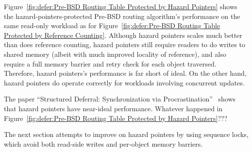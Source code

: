 Figure~\ref{fig:defer:Pre-BSD Routing Table Protected by Hazard Pointers}
shows the hazard-pointers-protected Pre-BSD routing algorithm's
performance on the same read-only workload as for
Figure~\ref{fig:defer:Pre-BSD Routing Table Protected by Reference Counting}.
Although hazard pointers scales much better than does reference counting,
hazard pointers still require readers to do writes to shared
memory (albeit with much improved locality of reference),
and also require a full memory barrier and retry check for each
object traversed.
Therefore, hazard pointers's performance is far short of ideal.
On the other hand, hazard pointers do operate correctly for workloads
involving concurrent updates.

\QuickQuiz{}
	The paper ``Structured Deferral: Synchronization via
	Procrastination''~\cite{McKenney:2013:SDS:2483852.2483867}
	shows that hazard pointers have near-ideal performance.
	Whatever happened in
	Figure~\ref{fig:defer:Pre-BSD Routing Table Protected by Hazard Pointers}???
 \QuickQuizEnd

The next section attempts to improve on hazard pointers by using
sequence locks, which avoid both read-side writes and per-object memory
barriers.
